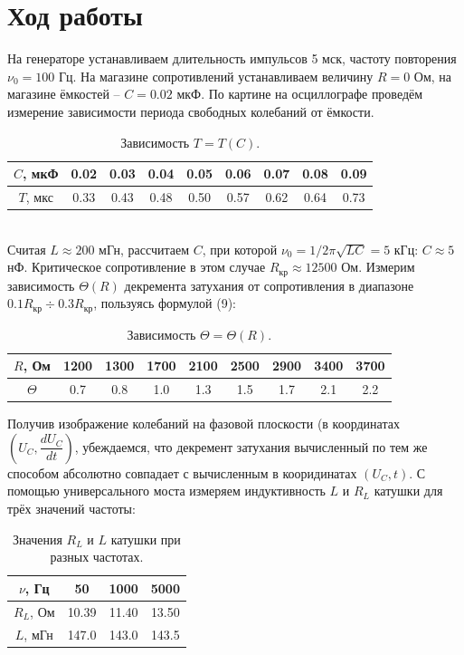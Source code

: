 \documentclass[a4paper,12pt]{report}
\begin{document}
\section*{Ход работы}
На генераторе устанавливаем длительность импульсов 5 мск, частоту повторения $\nu_0 = 100$ Гц. На магазине сопротивлений устанавливаем величину $R = 0$ Ом, на магазине ёмкостей -- $C = 0.02$ мкФ. По картине на осциллографе проведём измерение зависимости периода свободных колебаний от ёмкости.
\begin{table}[h]
\centering
\begin{tabular}{|c|c|c|c|c|c|c|c|c|}
\hline
$C$, мкФ    & 0.02 & 0.03 & 0.04 & 0.05 & 0.06 & 0.07 & 0.08 & 0.09 \\ \hline
$T$, мкс    & 0.33 & 0.43 & 0.48 & 0.50 & 0.57 & 0.62 & 0.64 & 0.73  \\ \hline
\end{tabular}
\caption{Зависимость $T = T(C)$.}
\end{table}\\
Считая $L \approx 200$ мГн, рассчитаем $C$, при которой $\nu_0 = 1/2\pi \sqrt{LC} = 5$ кГц: $C \approx 5$ нФ. Критическое сопротивление в этом случае $R_{\text{кр}} \approx 12500$ Ом. Измерим зависимость $\Theta(R)$ декремента затухания от сопротивления в диапазоне $0.1R_{\text{кр}}\div 0.3R_{\text{кр}}$, пользуясь формулой (9):
\begin{table}[h]
\centering
\begin{tabular}{|c|c|c|c|c|c|c|c|c|}
\hline
$R$, Ом     & 1200 & 1300 & 1700 & 2100 & 2500 & 2900 & 3400 & 3700 \\ \hline
$\Theta$ & 0.7  & 0.8  & 1.0  & 1.3  & 1.5  & 1.7  & 2.1  & 2.2  \\ \hline
\end{tabular}
\caption{Зависимость $\Theta = \Theta(R)$.}
\end{table}
\newpage
Получив изображение колебаний на фазовой плоскости (в координатах $\left(U_C, \dfrac{dU_C}{dt}\right)$, убеждаемся, что декремент затухания вычисленный по тем же способом абсолютно совпадает с вычисленным в кооридинатах $\left( U_C, t\right)$.
С помощью универсального моста измеряем индуктивность $L$ и $R_L$ катушки для трёх значений частоты:
\begin{table}[h]
\centering
\begin{tabular}{|c|c|c|c|}
\hline
$\nu$, Гц  & 50    & 1000  & 5000  \\ \hline
$R_L$, Ом & 10.39 & 11.40 & 13.50 \\ \hline
$L$, мГн & 147.0 & 143.0 & 143.5 \\ \hline
\end{tabular}
\caption{Значения $R_L$ и $L$ катушки при разных частотах.}
\end{table}
\end{document}
